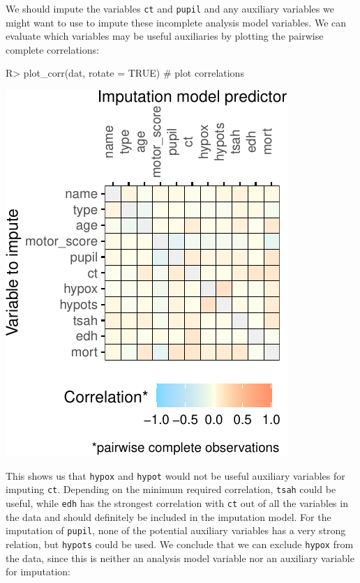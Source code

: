 \documentclass[
]{jss}
\begin{document}
We should impute the variables \texttt{ct} and \texttt{pupil} and any
auxiliary variables we might want to use to impute these incomplete
analysis model variables. We can evaluate which variables may be useful
auxiliaries by plotting the pairwise complete correlations:

\begin{CodeChunk}
\begin{CodeInput}
R> plot_corr(dat, rotate = TRUE) # plot correlations 
\end{CodeInput}


\begin{center}\includegraphics{Imputation_of_Incomplete_Multilevel_Data_files/figure-latex/impact_corr-1} \end{center}

\end{CodeChunk}

This shows us that \texttt{hypox} and \texttt{hypot} would not be useful
auxiliary variables for imputing \texttt{ct}. Depending on the minimum
required correlation, \texttt{tsah} could be useful, while \texttt{edh}
has the strongest correlation with \texttt{ct} out of all the variables
in the data and should definitely be included in the imputation model.
For the imputation of \texttt{pupil}, none of the potential auxiliary
variables has a very strong relation, but \texttt{hypots} could be used.
We conclude that we can exclude \texttt{hypox} from the data, since this
is neither an analysis model variable nor an auxiliary variable for
imputation:
\end{document}
